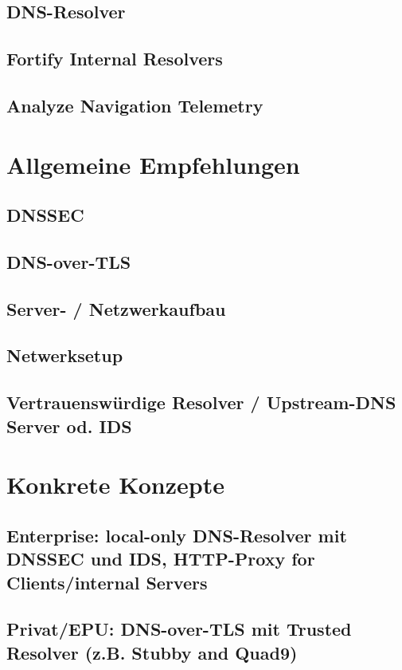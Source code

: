 \subsection{DNS-Resolver}

\begin{comment}
Wenn kein DNSSEC erzwungen wird (was noch schwer möglich ist) muss das risiko flascher Records akzeptiert werden. Über spezielle, vertrauenswündige Resolver kann das Risiko jedoch verringert werden.
\end{comment}

\subsection{Fortify Internal Resolvers}

\subsection{Analyze Navigation Telemetry}

\section{Allgemeine Empfehlungen}

\subsection{DNSSEC}

\subsection{DNS-over-TLS}
\subsection{Server- / Netzwerkaufbau}
\subsection{Netwerksetup}
\subsection{Vertrauenswürdige Resolver / Upstream-DNS Server od. IDS}

\begin{comment}
*Nur mit entsprechender Validierung des Zeilservers (DoT, etc.) weil sonst anfällig auf MitM, BGP-Hijacking, usw.*
\end{comment}

\section{Konkrete Konzepte}

\subsection{Enterprise: local-only DNS-Resolver mit DNSSEC und IDS, HTTP-Proxy for Clients/internal Servers}

\subsection{Privat/EPU: DNS-over-TLS  mit Trusted Resolver (z.B. Stubby and Quad9)}